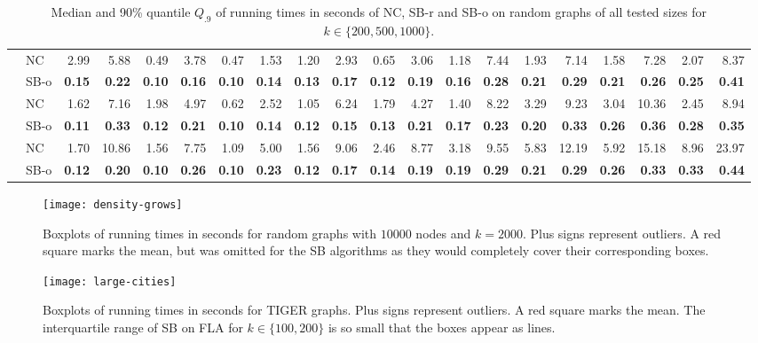 \documentclass[runningheads,a4paper]{llncs}
\begin{document}
\begin{sidewaystable}
\begin{tabularx}{1\textwidth}{p{0.8cm}p{0.8cm}|RR|RR|RR|RR|RR|RR|RR|RR|RR}
\hline
\centering{} & \centering NC & 2.99 & 5.88 & 0.49 & 3.78 & 0.47 & 1.53 & 1.20 & 2.93 & 0.65 & 3.06 & 1.18 & 7.44 & 1.93 & 7.14 & 1.58 & 7.28 & 2.07 & 8.37 \\
 & \centering SB-o  & \textbf{0.15} & \textbf{0.22} & \textbf{0.10} & \textbf{0.16} & \textbf{0.10} & \textbf{0.14} & \textbf{0.13} & \textbf{0.17} & \textbf{0.12} & \textbf{0.19} & \textbf{0.16} & \textbf{0.28} & \textbf{0.21} & \textbf{0.29} & \textbf{0.21} & \textbf{0.26} & \textbf{0.25} & \textbf{0.41} \\
\hline
\centering{} & \centering NC & 1.62 & 7.16 & 1.98 & 4.97 & 0.62 & 2.52 & 1.05 & 6.24 & 1.79 & 4.27 & 1.40 & 8.22 & 3.29 & 9.23 & 3.04 & 10.36 & 2.45 & 8.94 \\
 & \centering SB-o  & \textbf{0.11} & \textbf{0.33} & \textbf{0.12} & \textbf{0.21} & \textbf{0.10} & \textbf{0.14} & \textbf{0.12} & \textbf{0.15} & \textbf{0.13} & \textbf{0.21} & \textbf{0.17} & \textbf{0.23} & \textbf{0.20} & \textbf{0.33} & \textbf{0.26} & \textbf{0.36} & \textbf{0.28} & \textbf{0.35} \\
\hline
\centering{} & \centering NC & 1.70 & 10.86 & 1.56 & 7.75 & 1.09 & 5.00 & 1.56 & 9.06 & 2.46 & 8.77 & 3.18 & 9.55 & 5.83 & 12.19 & 5.92 & 15.18 & 8.96 & 23.97 \\
 & \centering SB-o  & \textbf{0.12} & \textbf{0.20} & \textbf{0.10} & \textbf{0.26} & \textbf{0.10} & \textbf{0.23} & \textbf{0.12} & \textbf{0.17} & \textbf{0.14} & \textbf{0.19} & \textbf{0.19} & \textbf{0.29} & \textbf{0.21} & \textbf{0.29} & \textbf{0.26} & \textbf{0.33} & \textbf{0.33} & \textbf{0.44} \\
    \hline
\end{tabularx}
\caption{Median and 90\% quantile $Q_{.9}$ of running times in seconds of NC, SB-r and SB-o on random graphs of all tested sizes for $k \in \{200, 500, 1000\}$.}
\end{sidewaystable}



\begin{sidewaysfigure}[tb]
\centering
\texttt{[image: density-grows]}
\caption{Boxplots of running times in seconds for random graphs with $\num{10000}$ nodes and $k = \num{2000}$. Plus signs represent outliers. A red square marks the mean, but was omitted for the SB algorithms as they would completely cover their corresponding boxes.}
\label{fig:sprand-boxplot}
\end{sidewaysfigure}

\begin{sidewaysfigure}[tb]
\centering
\texttt{[image: large-cities]}
\caption{Boxplots of running times in seconds for TIGER graphs. Plus signs represent outliers. A red square marks the mean. The interquartile range of SB on FLA for $k \in \{100, 200\}$ is so small that the boxes appear as lines.}
\label{fig:large-cities}
\end{sidewaysfigure}
\end{document}
